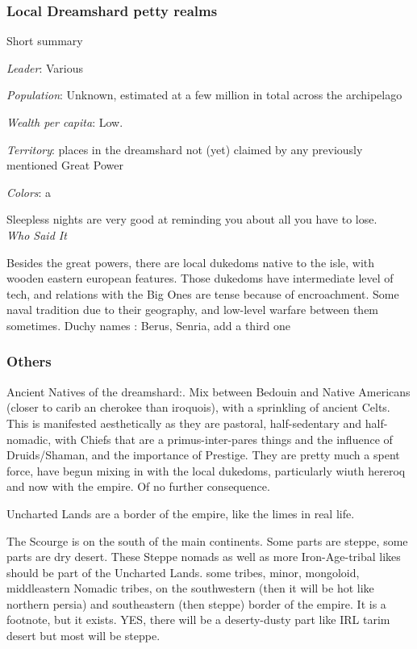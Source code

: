 \subsubsection{Local Dreamshard petty realms}


Short summary

\textit{Leader}: Various

\textit{Population}: Unknown, estimated at a few million in total across the archipelago

\textit{Wealth per capita}: Low.

\textit{Territory}: places in the dreamshard not (yet) claimed by any previously mentioned Great Power
    
\textit{Colors}: a

\begin{rpg-quotebox}
    Sleepless nights are very good at reminding you about all you have to lose. \\ \textendash \textit{Who Said It}
\end{rpg-quotebox}

Besides the great powers, there are local dukedoms native to the isle, with wooden eastern european features. Those dukedoms have intermediate level of tech, and relations with the Big Ones are tense because of encroachment. Some naval tradition due to their geography, and low-level warfare between them sometimes.
	Duchy names : Berus, Senria, add a third one

\subsubsection{Others}



Ancient Natives of the dreamshard:. Mix between Bedouin and Native Americans (closer to carib an cherokee than iroquois), with a sprinkling of ancient Celts. This is manifested aesthetically as they are pastoral, half-sedentary and half-nomadic, with Chiefs that are a primus-inter-pares things and the influence of Druids/Shaman, and the importance of Prestige. They are pretty much a spent force, have begun mixing in with the local dukedoms, particularly wiuth hereroq and now with the empire. Of no further consequence.

Uncharted Lands are a border of the empire, like the limes in real life.

The Scourge is on the south of the main continents. Some parts are steppe, some parts are dry desert. These Steppe nomads as well as more Iron-Age-tribal likes should be part of the Uncharted Lands. some tribes, minor, mongoloid, middleastern
Nomadic tribes, on the southwestern (then it will be hot like northern persia) and southeastern (then steppe) border of the empire. It is a footnote, but it exists. YES, there will be a deserty-dusty part like IRL tarim desert but most will be steppe.







